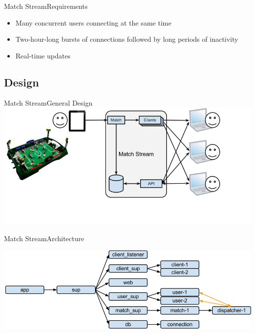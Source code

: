 \documentclass[utf8]{beamer}
\begin{document}
\begin{frame}{Match Stream}{Requirements}
	\begin{itemize}
		\item<+-> Many concurrent users connecting at the same time
		\item<+-> Two-hour-long bursts of connections followed by long periods of inactivity
		\item<+-> Real-time updates
	\end{itemize}
\end{frame}

\subsection{Design}
\begin{frame}{Match Stream}{General Design}
	\includegraphics[width=\textwidth]{img/MatchStream.png}
\end{frame}
\begin{frame}[t]{Match Stream}{Architecture}
	\begin{center}
		\includegraphics[width=\textwidth]{img/architecture-1.png}
	\end{center}
\end{frame}
\end{document}
